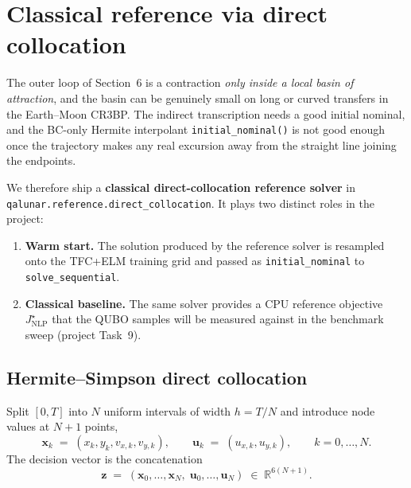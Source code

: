 \documentclass[8pt,a4paper]{article}
\newcommand{\R}{\mathbb{R}}
\newcommand{\bvec}[1]{\bm{#1}}
\newcommand{\xvec}{\bvec{x}}
\newcommand{\uvec}{\bvec{u}}
\theoremstyle{definition}
\theoremstyle{remark}
\begin{document}
\newpage
\section{Classical reference via direct collocation}
\label{sec:reference}

The outer loop of Section~6 is a contraction \emph{only inside a
local basin of attraction}, and the basin can be genuinely small on
long or curved transfers in the Earth--Moon CR3BP. The indirect
transcription needs a good initial nominal, and the BC-only Hermite
interpolant \texttt{initial\_nominal()} is not good enough once the
trajectory makes any real excursion away from the straight line
joining the endpoints.

We therefore ship a \textbf{classical direct-collocation reference
solver} in \texttt{qalunar.reference.direct\_collocation}. It plays
two distinct roles in the project:

\begin{enumerate}[leftmargin=1.5em]
  \item \textbf{Warm start.} The solution produced by the reference
    solver is resampled onto the TFC+ELM training grid and passed as
    \texttt{initial\_nominal} to
    \texttt{solve\_sequential}.
  \item \textbf{Classical baseline.} The same solver provides a CPU
    reference objective $J^{\star}_{\mathrm{NLP}}$ that the QUBO
    samples will be measured against in the benchmark sweep
    (project Task~9).
\end{enumerate}

\subsection{Hermite--Simpson direct collocation}

Split $[0, T]$ into $N$ uniform intervals of width $h = T/N$ and
introduce node values at $N+1$ points,
\[
  \xvec_k \;=\; (x_k, y_k, v_{x,k}, v_{y,k}),
  \qquad
  \uvec_k \;=\; (u_{x,k}, u_{y,k}),
  \qquad k = 0, \dots, N.
\]
The decision vector is the concatenation
\[
  \bvec{z} \;=\; (\xvec_0, \dots, \xvec_N,\;\uvec_0, \dots, \uvec_N)
     \;\in\; \R^{6(N+1)}.
\]
\end{document}
